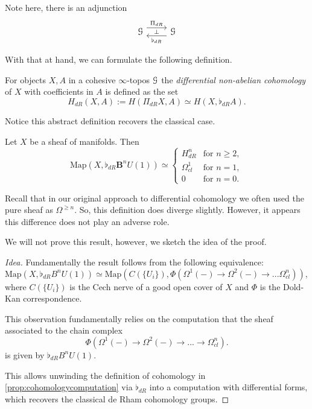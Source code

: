 \documentclass[10pt]{amsart}
\begin{document}
Note here, there is an adjunction 
\[ 
\begin{tikzcd}
	\lG \arrow[r, shift left=2, "\Pi_{dR}", "\bot"'] & \lG \arrow[l, shift left=2, "\flat_{dR}"]
\end{tikzcd}
\]

With that at hand, we can formulate the following definition.

\begin{definition}
	For objects $X,A$ in a cohesive $\infty$-topos $\mathcal{G}$ the \emph{differential non-abelian cohomology} of $X$ with coefficients in $A$ is defined as the set
	\[	H_{dR}(X, A) := H(\Pi_{dR}X,A) \simeq H(X, \flat_{dR} A). \]
\end{definition}

Notice this abstract definition recovers the classical case. 

\begin{proposition} \label{prop:cohomologycomputation}
 Let $X$ be a sheaf of manifolds. Then 
	\[ \mathrm{Map}(X,\flat_{dR}	\mathbf{B}^n U(1)) \simeq 
	\begin{cases}
	 H^{n}_{dR} & \text{for } n \geq 2, \\
		\Omega^1_{cl} & \text{for } n = 1, \\
		0 & \text{for } n = 0.
	\end{cases} 	
	\]
\end{proposition}

\begin{remark}
	Recall that in our original approach to differential cohomology we often used the pure sheaf as $\Omega^{\geq n}$. So, this definition does diverge slightly. However, it appears this difference does not play an adverse role.
\end{remark}

We will not prove this result, however, we	sketch the idea of the proof.
\begin{proof}[Idea]
	 Fundamentally the result follows from the following equivalence:
	\[\mathrm{Map}(X, \flat_{dR} B^n	U(1)) \simeq \mathrm{Map}(C(\{U_i\}), \Phi(\Omega^1(-) \to \Omega^2(-) \to ... \Omega^n_{cl})), \]
	where $C(\{U_i\})$ is the Cech nerve of a good open cover of $X$ and $\Phi$ is the Dold-Kan correspondence.

	This observation fundamentally relies on the computation that the sheaf associated to the chain complex
\[	\Phi(\Omega^1(-) \to \Omega^2(-) \to ...	\to \Omega^n_{cl}). \] 
 is given by $\flat_{dR} B^n	U(1)$.

	This allows unwinding the definition of cohomology in \cref{prop:cohomologycomputation} via $\flat_{dR}$ into a computation with differential forms, which recovers the classical de Rham cohomology groups.
\end{proof}
\end{document}
